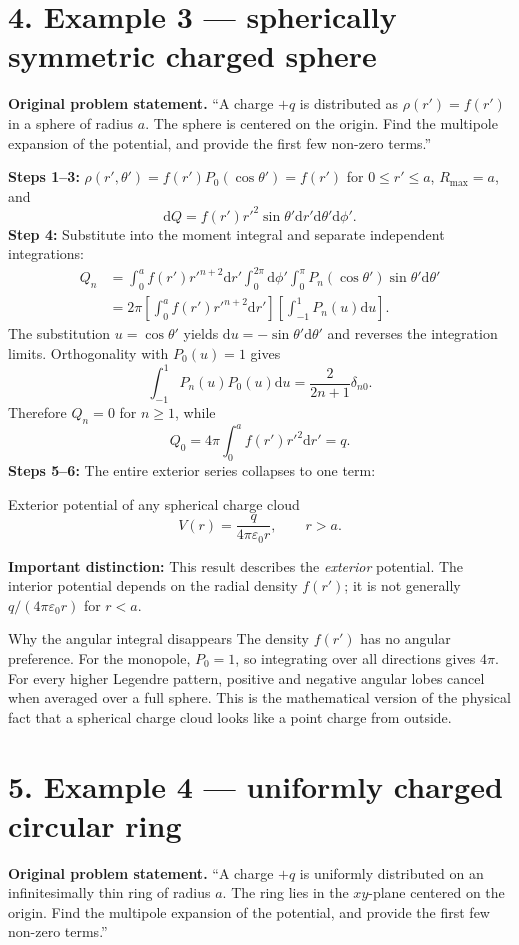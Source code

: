 \documentclass[10pt,letterpaper]{article}
\newcommand{\eps}{\varepsilon_0}\newcommand{\dd}{\mathrm d}
\begin{document}
\section*{4. Example 3 --- spherically symmetric charged sphere}
\textbf{Original problem statement.} ``A charge $+q$ is distributed as $\rho(r')=f(r')$ in a sphere of radius $a$. The sphere is centered on the origin. Find the multipole expansion of the potential, and provide the first few non-zero terms.''

\textbf{Steps 1--3:} $\rho(r',\theta')=f(r')P_0(\cos\theta')=f(r')$ for $0\le r'\le a$, $R_{\max}=a$, and
\[\dd Q=f(r')r'^2\sin\theta'\dd r'\dd\theta'\dd\phi'.\]
\textbf{Step 4:} Substitute into the moment integral and separate independent integrations:
\begin{align*}
Q_n&=\int_0^a f(r')r'^{n+2}\dd r'\int_0^{2\pi}\dd\phi'\int_0^\pi P_n(\cos\theta')\sin\theta'\dd\theta'\\
&=2\pi\left[\int_0^a f(r')r'^{n+2}\dd r'\right]\left[\int_{-1}^{1}P_n(u)\dd u\right].
\end{align*}
The substitution $u=\cos\theta'$ yields $\dd u=-\sin\theta'\dd\theta'$ and reverses the integration limits. Orthogonality with $P_0(u)=1$ gives
\[\int_{-1}^1P_n(u)P_0(u)\dd u=\frac{2}{2n+1}\delta_{n0}.\]
Therefore $Q_n=0$ for $n\ge1$, while
\[Q_0=4\pi\int_0^a f(r')r'^2\dd r'=q.\]
\textbf{Steps 5--6:} The entire exterior series collapses to one term:
\begin{result}{Exterior potential of any spherical charge cloud}
\[\boxed{V(r)=\frac{q}{4\pi\eps r},\qquad r>a.}\]
\end{result}
\textbf{Important distinction:} This result describes the \emph{exterior} potential. The interior potential depends on the radial density $f(r')$; it is not generally $q/(4\pi\eps r)$ for $r<a$.
\begin{insight}{Why the angular integral disappears}
The density $f(r')$ has no angular preference. For the monopole, $P_0=1$, so integrating over all directions gives $4\pi$. For every higher Legendre pattern, positive and negative angular lobes cancel when averaged over a full sphere. This is the mathematical version of the physical fact that a spherical charge cloud looks like a point charge from outside.
\end{insight}
\section*{5. Example 4 --- uniformly charged circular ring}
\textbf{Original problem statement.} ``A charge $+q$ is uniformly distributed on an infinitesimally thin ring of radius $a$. The ring lies in the $xy$-plane centered on the origin. Find the multipole expansion of the potential, and provide the first few non-zero terms.''
\end{document}
